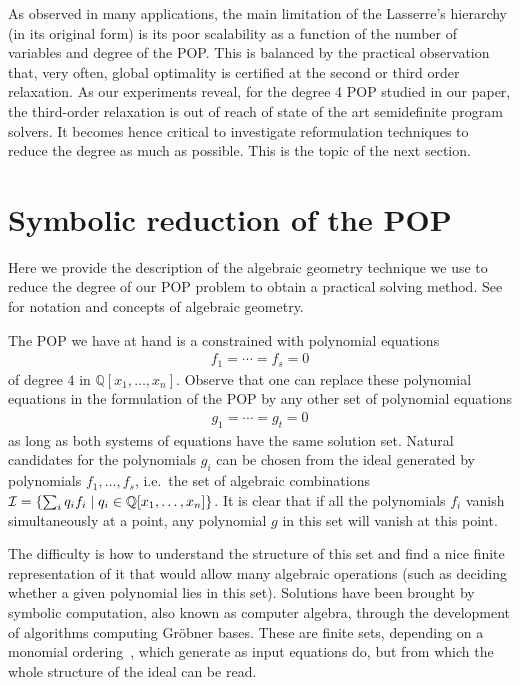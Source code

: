 As observed in many applications, the main limitation of the Lasserre's hierarchy (in its original form) is its poor scalability as a function of the number of variables and degree of the POP. This is balanced by the practical observation that, very often, global optimality is certified at the second or third order relaxation. As our experiments reveal, for the degree 4 POP studied in our paper, the third-order relaxation is out of reach of state of the art semidefinite program solvers. It becomes hence critical to investigate reformulation techniques to reduce the degree as much as possible. This is the topic of the next section.

\section{Symbolic reduction of the POP}
Here we provide the description of the algebraic geometry technique we use to reduce the degree of our POP problem to obtain a practical solving method. See~\cite{Cox-Little-Shea2015} for notation and concepts of algebraic geometry.

The POP we have at hand is a constrained with polynomial equations
\begin{align}
f_1=\cdots=f_s=0
\end{align}
of degree $4$ in $\mathbb{Q}[x_1, \ldots, x_n]$. Observe that one can replace
these polynomial equations in the formulation of the POP by any other set of
polynomial equations
\begin{align}
g_1=\cdots=g_t=0
\end{align}
as long as both systems of equations have the same solution set. Natural
candidates for the polynomials $g_i$ can be chosen from the ideal generated by
polynomials $f_1, \ldots, f_s$, i.e.\ the set of algebraic combinations $\mathcal{I} = \{\sum_i q_i
f_i\mid q_i \in \mathbb{Q}[x_1, \ldots, x_n]\}$. It is clear that if all the
polynomials $f_i$ vanish simultaneously at a point, any polynomial $g$ in this set will
vanish at this point.

The difficulty is how to understand the structure of this set and find a nice
finite representation of it that would allow many algebraic operations (such as
deciding whether a given polynomial lies in this set). Solutions have been
brought by symbolic computation, also known as computer algebra, through the development
of algorithms computing Gr\"obner bases. These are finite sets, depending on a monomial ordering~\cite{Cox-Little-Shea2015}, which generate \Ideal{} as input equations do, but from which
the whole structure of the ideal \Ideal{} can be read.

